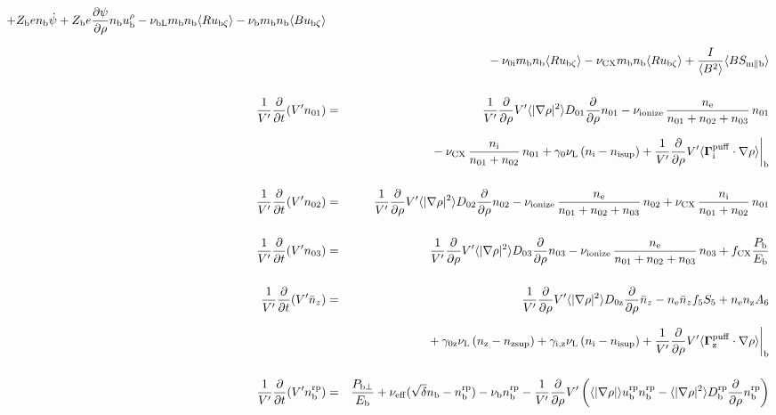 \documentclass[11pt]{article}
\def\bvec#1{\leavevmode\hbox{\boldmath$#1$}}
\let\vec=\bvec
\def\r#1{{\rm#1}}
\def\aves#1{\langle#1\rangle}
\def\dd#1#2{\frac{\partial #1}{\partial #2}}
\def\para{\parallel}
\def\ddrho{\frac{\partial}{\partial\rho}}
\def\ddV{\frac{\partial}{\partial V}}
\def\ddt{\frac{\partial}{\partial t}}
\def\mi{m_\r{i}}
\def\mb{m_\r{b}}
\def\nee{n_\r{e}}
\def\ni{n_\r{i}}
\def\nz{n_\r{z}}
\def\nb{n_\r{b}}
\def\Te{T_\r{e}}
\def\Zi{Z_\r{i}}
\def\Zb{Z_\r{b}}
\def\uzt#1{u_{\r{#1}\zeta}}
\def\upara#1{u_{\r{#1}\para}}
\def\qhatpara#1{\hat{q}_{\r{#1}\para}}
\def\urho#1{u_\r{#1}^\rho}
\def\De{D_\r{e}}
\def\nun#1{\nu_\r{0#1}}
\def\nsup#1{n_\r{#1sup}}
\def\nbrp{n_\r{b}^\r{rp}}
\def\ubrp{u_\r{b}^\r{rp}}
\def\Dbrp{D_\r{b}^\r{rp}}
\def\bri{\aves{B^2}\aves{R^2} - I^2}
\def\Pbperp{P_{\r{b}\perp}}
\def\Pb{P_\r{b}}
\def\Eb{E_\r{b}}
\def\nna{n_{01}}
\def\nnb{n_{02}}
\def\nnc{n_{03}}
\def\nnz{\bar{n}_{z}}
\def\nueff{\nu_\r{eff}}
\def\fCX{f_\r{CX}}
\def\nuL{\nu_\r{L}}
\def\nuCX{\nu_\r{CX}}
\def\nuion{\nu_\r{ionize}}
\def\nub{\nu_\r{b}}
\def\nuOL{\nu_\r{OL}}
\def\nubL{\nu_\r{bL}}
\def\red#1{\textcolor{red}{#1}}
\begin{document}
\begin{eqnarray}
%
  + \Zb e              \nb \dot{\psi}
%
  + \Zb e \dd{\psi}{\rho} \nb \urho{b}
%
%
  - \nubL \mb \nb \aves{R \uzt{b}}
%
  - \nub  \mb \nb \aves{B \uzt{b}}
\nonumber\\[2.5mm]&&{}
%
  - \nun{i} \mb \nb \aves{R \uzt{b}}
%
  - \nuCX \mb \nb \aves{R \uzt{b}}
%
%
  + \frac{I}{\aves{B^2}} \aves{B S_{\r{m}\para\r{b}}}
%
\\[5mm]
  \frac{1}{V'} \ddt (V' \nna) &=& 
%
    \frac{1}{V'} \ddrho V' \aves{|\nabla\rho|^2} D_{01} \ddrho \nna
%
  - \nuion\, \frac{\nee}{\nna + \nnb + \nnc}\, \nna
%
\nonumber\\[2.5mm]&&{}
  - \nuCX\, \frac{\ni}{\nna + \nnb}\, \nna
%
  + \gamma_0 \nuL \, (\ni - \nsup{i})
%
  + \frac{1}{V'} \ddrho V' \aves{\vec{\Gamma}^\r{puff}_\r{i}\cdot\nabla\rho}\biggr|_\r{b}
\\[5mm]
  \frac{1}{V'} \ddt (V' \nnb) &=& 
%
    \frac{1}{V'} \ddrho V' \aves{|\nabla\rho|^2} D_{02} \ddrho \nnb
%
  - \nuion\, \frac{\nee}{\nna + \nnb + \nnc}\, \nnb
%
  + \nuCX\, \frac{\ni}{\nna + \nnb}\, \nna
%
\\[5mm]
  \frac{1}{V'} \ddt (V' \nnc) &=& 
%
    \frac{1}{V'} \ddrho V' \aves{|\nabla\rho|^2} D_{03} \ddrho \nnc
%
  - \nuion\, \frac{\nee}{\nna + \nnb + \nnc}\, \nnc
%
  + \fCX \frac{\Pb}{\Eb}
\\[5mm]
  \frac{1}{V'} \ddt (V' \nnz) &=& 
%
    \frac{1}{V'} \ddrho V' \aves{|\nabla\rho|^2} D_{0\r{z}} \ddrho \nnz
%
  - \nee \nnz f_5S_5 + \nee \nz A_6 
\nonumber\\[2.5mm]&&{}
%
  + \gamma_\r{0z} \nuL \, (\nz - \nsup{z})
%
  + \gamma_\r{i,z} \nuL \, (\ni - \nsup{i})
%
  + \frac{1}{V'} \ddrho V' \aves{\vec{\Gamma}^\r{puff}_\r{z}\cdot\nabla\rho}\biggr|_\r{b}
\\[5mm]
  \frac{1}{V'} \ddt (V' \nbrp) &=&
%
    \frac{\Pbperp}{\Eb}
%
  + \nueff (\sqrt{\delta} \nb - \nbrp)
%
  - \nub \nbrp
%
  - \frac{1}{V'} \ddrho V' \left( \aves{|\nabla\rho|} \ubrp \nbrp - \aves{|\nabla\rho|^2} \Dbrp \ddrho \nbrp \right)
%
\end{eqnarray}
\end{document}

